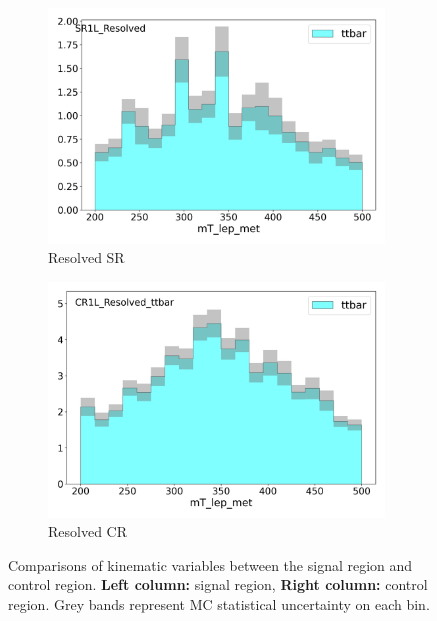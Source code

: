 \begin{figure}[htbp]
\begin{subfigure}{0.49\textwidth}
      \includegraphics[width = 0.98\textwidth]{Figures/4/CRSR/SR1L_Resolved/mT_lep_met.png}
      \caption{Resolved SR \mtlepmet}
      \end{subfigure}
      \begin{subfigure}{0.49\textwidth}
      \includegraphics[width = 0.98\textwidth]{Figures/4/CRSR/CR1L_Resolved_ttbar/mT_lep_met.png}
      \caption{Resolved CR \mtlepmet}
      \end{subfigure}
      \caption{Comparisons of kinematic variables between the \resolved signal region and \ttbar control region. \textbf{Left column:} signal region, \textbf{Right column:} control region. Grey bands represent MC statistical uncertainty on each bin.}
      \label{fig:CRSR_resolved}
   \end{figure}
